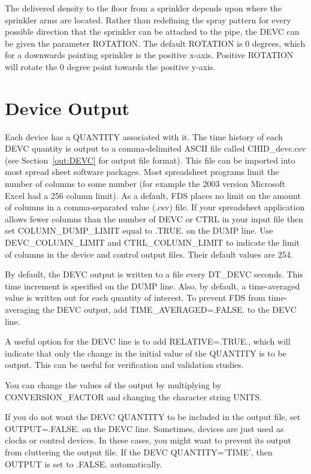 \documentclass[11pt]{book}
\begin{document}
The delivered density to the floor from a sprinkler depends upon where the sprinkler arms are located.  Rather than redefining the spray pattern for every possible direction that the sprinkler can be attached to the pipe, the {\ct DEVC} can be given the parameter {\ct ROTATION}.  The default {\ct ROTATION} is 0 degrees, which for a downwards pointing sprinkler is the positive x-axis.  Positive {\ct ROTATION} will rotate the 0 degree point towards the positive y-axis.

\section{Device Output}
\label{info:out:DEVC}

Each device has a {\ct QUANTITY} associated with it.
The time history of each {\ct DEVC} quantity is output to a comma-delimited
ASCII file called {\ct CHID\_devc.csv}
(see Section~\ref{out:DEVC} for output file format).
This file can be imported into most spread sheet software packages.  Most spreadsheet programs limit the number of columns to some number (for example the 2003 version Microsoft Excel had a 256 column limit).  As a default, FDS places no limit on the amount of columns in a comma-separated value (.csv) file.  If your spreadsheet application allows fewer columns than the number of {\ct DEVC} or {\ct CTRL} in your input file then set {\ct COLUMN\_DUMP\_LIMIT} equal to {\ct .TRUE.} on the {\ct DUMP} line.
Use {\ct DEVC\_COLUMN\_LIMIT} and {\ct CTRL\_COLUMN\_LIMIT} to indicate the limit of columns in the
device and control output files. Their default values are 254.

By default, the {\ct DEVC} output is written to a file every {\ct DT\_DEVC} seconds.
This time increment is specified on the {\ct DUMP} line. Also, by default,
a time-averaged value is written out for each quantity of interest. To prevent FDS from time-averaging the {\ct DEVC} output, add
{\ct TIME\_AVERAGED=.FALSE.} to the {\ct DEVC} line.

A useful option for the {\ct DEVC} line is to add {\ct RELATIVE=.TRUE.}, which will indicate that only the change in
the initial value of the {\ct QUANTITY} is to be output. This can be useful for verification and validation studies.

You can change the values of the output by multiplying by {\ct CONVERSION\_FACTOR} and changing the character string {\ct UNITS}.

If you do not want the {\ct DEVC} {\ct QUANTITY} to be included in the output file, set {\ct OUTPUT=.FALSE.} on the {\ct DEVC} line. Sometimes, devices are just used as clocks or control devices. In these cases, you might want to prevent its output from cluttering the output file. If the {\ct DEVC} {\ct QUANTITY='TIME'}, then {\ct OUTPUT} is set to {\ct .FALSE.} automatically.
\end{document}
